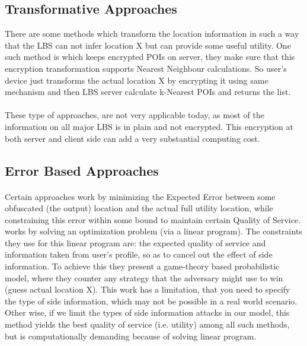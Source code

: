 \documentclass{report}
\begin{document}
\subsection{Transformative Approaches}
There are some methods which transform the location information in such a way that the LBS can not infer location X but can provide some useful utility. One such method is \cite{khoshgozaran2007blind} which keeps encrypted POIs on server, they make sure that this encryption transformation supports Nearest Neighbour calculations. So user's device just transforms the actual location X by encrypting it using same mechanism and then LBS server calculate k-Nearest POIs and returns the list.

\paragraph{}
These type of approaches, are not very applicable today, as most of the information on all major LBS is in plain and not encrypted. This encryption at both server and client side can add a very substantial computing cost.



\subsection{Error Based Approaches}
\paragraph{}
Certain approaches work by minimizing the Expected Error between some obfuscated (the output) location and the actual full utility location, while constraining this error within some bound to maintain certain Quality of Service. \cite{shokri2012protecting} works by solving an optimization problem (via a linear program). The constraints they use for this linear program are: the expected quality of service and information taken from user's profile, so as to cancel out the effect of side information. To achieve this they present a game-theory based probabilistic model, where they counter any strategy that the adversary might use to win (guess actual location X). This work has a limitation, that you need to specify the type of side information, which may not be possible in a real world scenario. Other wise, if we limit the types of side information attacks in our model, this method yields the best quality of service (i.e. utility) among all such methods, but is computationally demanding because of solving linear program.
\end{document}
